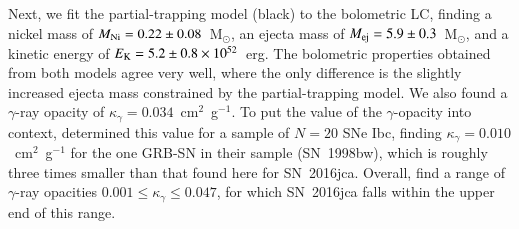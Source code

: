 \documentclass[traditabstract,longauth]{aa}
\begin{document}
Next, we fit the partial-trapping model (black) to the bolometric LC, finding a nickel mass of $M_{\rm Ni} = 0.22\pm0.08$~M$_{\odot}$, an ejecta mass of $M_{\rm ej} = 5.9\pm0.3$~M$_{\odot}$, and a kinetic energy of $E_{\rm K} = 5.2\pm0.8\times10^{52}$~erg.  The bolometric properties obtained from both models agree very well, where the only difference is the slightly increased ejecta mass constrained by the partial-trapping model. We also found a $\gamma$-ray opacity of $\kappa_{\gamma} = 0.034$~cm$^2$~g$^{-1}$.  To put the value of the $\gamma$-opacity into context, \citet{Wheeler15} determined this value for a sample of $N=20$ SNe Ibc, finding $\kappa_{\gamma} = 0.010$~cm$^2$~g$^{-1}$ for the one GRB-SN in their sample (SN~1998bw), which is roughly three times smaller than that found here for SN~2016jca.  Overall, \citet{Wheeler15} find a range of $\gamma$-ray opacities $0.001 \leq \kappa_{\gamma} \leq 0.047$, for which SN~2016jca falls within the upper end of this range.

\end{document}
